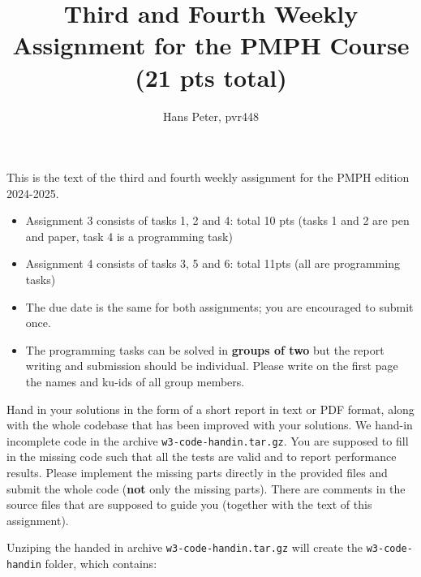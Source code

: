 \documentclass{article}
\title{Third and Fourth Weekly Assignment for the PMPH Course (21 pts total)}
\author{Hans Peter, pvr448}
\date{}
\begin{document}
\maketitle

This is the text of the third and fourth weekly assignment for the PMPH 
edition 2024-2025.  

\begin{itemize}
    \item Assignment 3 consists of tasks 1, 2 and 4: total 10 pts (tasks 1 and 2 are pen and paper, task 4 is a programming task)
    \item Assignment 4 consists of tasks 3, 5 and 6: total 11pts (all are programming tasks)
    \item The due date is the same for both assignments; you are encouraged to submit once.
    \item The programming tasks can be solved in \textbf{groups of two} but the report writing and submission should be individual. Please write on the first page the names and ku-ids of all group members.
\end{itemize}

Hand in your solutions in the form of a short report in text or PDF
format, along with the whole codebase that has been improved with your
solutions. We hand-in incomplete code in 
the archive \texttt{w3-code-handin.tar.gz}. You are supposed to fill in the missing
code such that all the tests are valid and to report performance 
results. Please implement the missing parts directly in the provided
files and submit the whole code (\textbf{not} only the missing parts).
There are comments in the source files that are supposed to guide you
(together with the text of this assignment).

Unziping the handed in archive \texttt{w3-code-handin.tar.gz} will create the \texttt{w3-code-handin}
folder, which contains:
\end{document}
